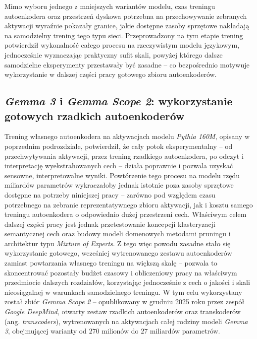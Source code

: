   Mimo wyboru jednego z mniejszych wariantów modelu, czas treningu autoenkodera oraz przestrzeń dyskowa potrzebna na przechowywanie zebranych aktywacji wyraźnie pokazały granice, jakie dostępne zasoby sprzętowe nakładają na samodzielny trening tego typu sieci. Przeprowadzony na tym etapie trening potwierdził wykonalność całego procesu na rzeczywistym modelu językowym, jednocześnie wyznaczając praktyczny sufit skali, powyżej którego dalsze samodzielne eksperymenty przestawały być zasadne -- co bezpośrednio motywuje wykorzystanie w dalszej części pracy gotowego zbioru autoenkoderów.

  \subsection{\textit{Gemma 3} i \textit{Gemma Scope 2}: wykorzystanie gotowych rzadkich autoenkoderów}
  \label{sec:gemma_scope}
  Trening własnego autoenkodera na aktywacjach modelu \textit{Pythia 160M}, opisany w poprzednim podrozdziale, potwierdził, że cały potok eksperymentalny -- od przechwytywania aktywacji, przez trening rzadkiego autoenkodera, po odczyt i interpretację wyekstrahowanych cech -- działa poprawnie i pozwala uzyskać sensowne, interpretowalne wyniki. Powtórzenie tego procesu na modelu rzędu miliardów parametrów wykraczałoby jednak istotnie poza zasoby sprzętowe dostępne na potrzeby niniejszej pracy -- zarówno pod względem czasu potrzebnego na zebranie reprezentatywnego zbioru aktywacji, jak i kosztu samego treningu autoenkodera o odpowiednio dużej przestrzeni cech. Właściwym celem dalszej części pracy jest jednak przetestowanie koncepcji klasteryzacji semantycznej cech oraz budowy modeli domenowych metodami pruningu i architektur typu \textit{Mixture of Experts}. Z tego więc powodu zasadne stało się wykorzystanie gotowego, wcześniej wytrenowanego zestawu autoenkoderów zamiast powtarzania własnego treningu na większą skalę -- pozwala to skoncentrować pozostały budżet czasowy i obliczeniowy pracy na właściwym przedmiocie dalszych rozdziałów, korzystając jednocześnie z cech o jakości i skali nieosiągalnej w warunkach samodzielnego treningu. \newline
  W tym celu wykorzystany został zbiór \textit{Gemma Scope 2} \cite{gemma_scope_2_2025} -- opublikowany w grudniu 2025 roku przez zespół \textit{Google DeepMind}, otwarty zestaw rzadkich autoenkoderów oraz transkoderów (ang. \textit{transcoders}), wytrenowanych na aktywacjach całej rodziny modeli \textit{Gemma 3}, obejmującej warianty od $270$ milionów do $27$ miliardów parametrów. \newline
